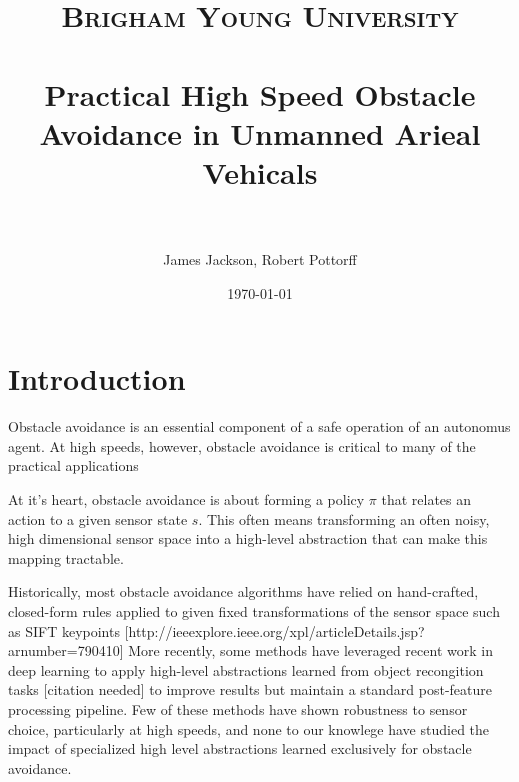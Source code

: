 \documentclass[paper=a4, fontsize=11pt]{scrartcl} %
\title{
\normalfont \normalsize
\textsc{Brigham Young University} \\ [25pt] %
\horrule{0.5pt} \\[0.4cm] %
\huge Practical High Speed Obstacle Avoidance in Unmanned Arieal Vehicals\\ %
\horrule{2pt} \\[0.5cm] %
}
\author{James Jackson, Robert Pottorff} %
\date{\normalsize\today} %
\begin{document}
\maketitle %


\section{Introduction}

	Obstacle avoidance is an essential component of a safe operation of an autonomus agent.
	At high speeds, however, obstacle avoidance is critical to many of the practical applications
	
	At it's heart, obstacle avoidance is about forming a policy $\pi$ that relates an action to a given sensor state $s$.
	This often means transforming an often noisy, high dimensional sensor space into a high-level abstraction that can make this mapping tractable.
	
	Historically, most obstacle avoidance algorithms have relied on hand-crafted, closed-form rules applied to given fixed transformations of the sensor space such as SIFT keypoints [http://ieeexplore.ieee.org/xpl/articleDetails.jsp?arnumber=790410]
	More recently, some methods have leveraged recent work in deep learning to apply high-level abstractions learned from object recongition tasks [citation needed] to improve results but maintain a standard post-feature processing pipeline.
	Few of these methods have shown robustness to sensor choice, particularly at high speeds, and none to our knowlege have studied the impact of specialized high level abstractions learned exclusively for obstacle avoidance.
	
\end{document}
